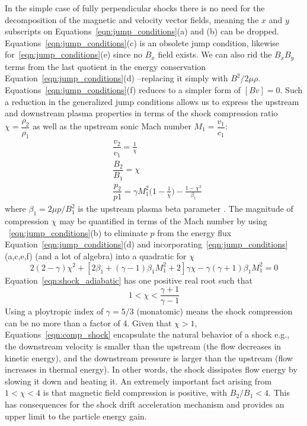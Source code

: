In the simple case of fully perpendicular shocks there is no need for the decomposition of the magnetic and velocity vector fields, meaning the $x$ and $y$ subscripts on Equations~\ref{eqn:jump_conditions}(a) and (b) can be dropped. Equations~\ref{eqn:jump_conditions}(c) is an obsolete jump condition, likewise for~\ref{eqn:jump_conditions}(e) since no $B_x$ field exists. We can also rid the $B_{x}B_{y}$ terms from the last quotient in the energy conservation Equation~\ref{eqn:jump_conditions}(d) --replacing it simply with $B^{2}/2\mu\rho$. Equations~\ref{eqn:jump_conditions}(f) reduces to a simpler form of $[Bv]=0$. Such a reduction in the generalized jump conditions allows us to express the upstream and downstream plasma properties in terms of the shock compression ratio $\chi=\dfrac{\rho_{2}}{\rho_{1}}$ as well as the upstream sonic Mach number $M_{1}=\dfrac{v_{1}}{c_{1}}$:
\begin{subequations}
\begin{align}
&\dfrac{v_{2}}{v_{1}}=\frac{1}{\chi} \\
&\dfrac{B_{2}}{B_{1}}=\chi \\
&\dfrac{p_{2}}{p{1}}=\gamma M_{1}^2\bigg(1-\frac{1}{\chi}\bigg) - \frac{1-\chi^2}{\beta_{1}}
\end{align}
\label{eqn:comp_shock}
\end{subequations}
where $\beta_{1}=2\mu p/B_{1}^2$ is the upstream plasma beta parameter \citep{priest2000}. The magnitude of compression $\chi$ may be quantified in terms of the Mach number by using ~\ref{eqn:jump_conditions}(b) to eliminate $p$ from the energy flux Equation~\ref{eqn:jump_conditions}(d) and incorporating~\ref{eqn:jump_conditions}(a,c,e,f) (and a lot of algebra) into a quadratic for $\chi$
\begin{equation}
2(2-\gamma)\chi^{2}+[2\beta_{1}+(\gamma-1)\beta_{1}M_{1}^2+2]\gamma\chi - \gamma(\gamma+1)\beta_{1}M_{1}^2=0
\label{eqn:shock_adiabatic}
\end{equation}
Equation~\ref{eqn:shock_adiabatic} has one positive real root such that 
\begin{equation}
1< \chi < \frac{\gamma+1}{\gamma-1}
\label{eqn:compression}
\end{equation}
Using a ploytropic index of $\gamma=5/3$ (monatomic) means the shock compression can be no more than a factor of 4. Given that $\chi>1$, Equations~\ref{eqn:comp_shock} encapsulate the natural behavior of a shock e.g., the downstream velocity is smaller than the upstream (the flow decreases in kinetic energy), and the downstream pressure is larger than the upstream (flow increases in thermal energy). In other words, the shock dissipates flow energy by slowing it down and heating it. An extremely important fact arising from $1<\chi<4$ is that magnetic field compression is positive, with $B_{2}/B_{1} <4$. This has consequences for the shock drift acceleration mechanism and provides an upper limit to the particle energy gain.

